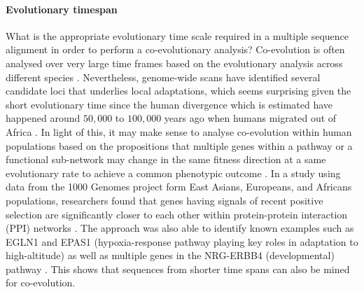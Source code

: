 \paragraph{Evolutionary timespan}
What is the appropriate evolutionary time scale required in a multiple sequence alignment in order to perform a co-evolutionary analysis?
Co-evolution is often analysed over very large time frames based on the evolutionary analysis across different species \cite{qian2015recent}.
Nevertheless, genome-wide scans have identified several candidate loci that underlies local adaptations, which seems surprising given the short evolutionary time since the human divergence which is estimated have happened around $50,000$ to $100,000$ years ago when humans migrated out of Africa \cite{qian2015recent}.
In light of this, it may make sense to analyse co-evolution within human populations based on the propositions that multiple genes within a pathway or a functional sub-network may change in the same fitness direction at a same evolutionary rate to achieve a common phenotypic outcome \cite{qian2015recent}.
In a study using data from the 1000 Genomes project \cite{10002012integrated} form East Asians, Europeans, and Africans populations, researchers found that genes having signals of recent positive selection are significantly closer to each other within protein-protein interaction (PPI) networks \cite{qian2015recent}.
The approach was also able to identify known examples such as EGLN1 and EPAS1 (hypoxia-response pathway playing key roles in adaptation to high-altitude) as well as multiple genes in the NRG-ERBB4 (developmental) pathway \cite{qian2015recent}.
This shows that sequences from shorter time spans can also be mined for co-evolution.

